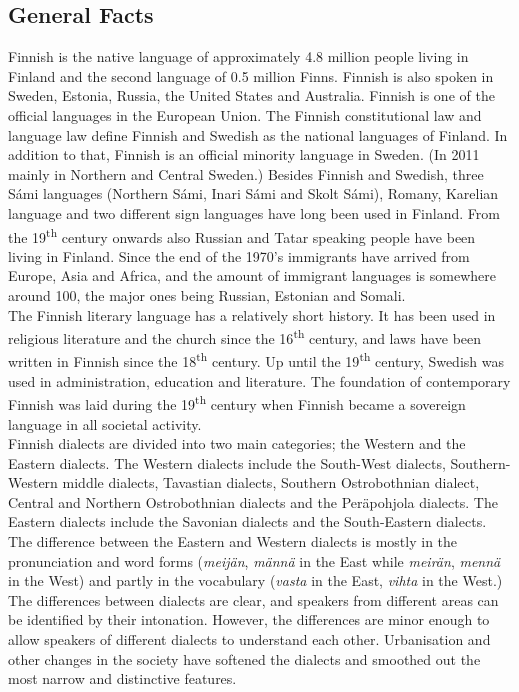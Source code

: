 \begin{multicols}{2}
\subsection{General Facts}


Finnish is the native language of approximately 4.8 million people living in
Finland and the second language of 0.5 million Finns. Finnish is also spoken in
Sweden, Estonia, Russia, the United States and Australia.
Finnish is one of the official languages in the European Union. The Finnish
constitutional law and language law define Finnish and Swedish as the national
languages of Finland. In addition to that, Finnish is an official minority
language in Sweden. (In 2011 mainly in Northern and Central Sweden.) Besides
Finnish and Swedish, three Sámi languages (Northern Sámi, Inari Sámi and Skolt
Sámi), Romany, Karelian language and two different sign languages have long
been used in Finland. From the 19\textsuperscript{th} century onwards also Russian and Tatar
speaking people have been living in Finland. Since the end of the 1970’s
immigrants have arrived from Europe, Asia and Africa, and the amount of
immigrant languages is somewhere around 100, the major ones being Russian,
Estonian and Somali.\\
The Finnish literary language has a relatively short history. It has been used
in religious literature and the church since the 16\textsuperscript{th} century, and laws have
been written in Finnish since the 18\textsuperscript{th} century. Up until the 19\textsuperscript{th} century,
Swedish was used in administration, education and literature. The foundation of
contemporary Finnish was laid during the 19\textsuperscript{th} century when Finnish became a
sovereign language in all societal activity.\\
Finnish dialects are divided into two main categories; the Western and the
Eastern dialects. The Western dialects include the South-West dialects,
Southern-Western middle dialects, Tavastian dialects, Southern Ostrobothnian
dialect, Central and Northern Ostrobothnian dialects and the Peräpohjola
dialects. The Eastern dialects include the Savonian dialects and the
South-Eastern dialects. The difference between the Eastern and Western dialects
is mostly in the pronunciation and word forms
 (\textit{\foreignlanguage{finnish}{\textit{meijän}}},
  \textit{\foreignlanguage{finnish}{\textit{männä}}} in the East while
  \textit{\foreignlanguage{finnish}{\textit{meirän}}},
  \textit{\foreignlanguage{finnish}{\textit{mennä}}} in the West)
and partly in the vocabulary
 (\textit{\foreignlanguage{finnish}{\textit{vasta}}} in the East,
  \textit{\foreignlanguage{finnish}{\textit{vihta}}} in the West.)
The differences between dialects are clear, and speakers
from different areas can be identified by their intonation. However, the
differences are minor enough to allow speakers of different dialects to
understand each other. Urbanisation and other changes in the society have
softened the dialects and smoothed out the most narrow and distinctive
features.


\end{multicols}
